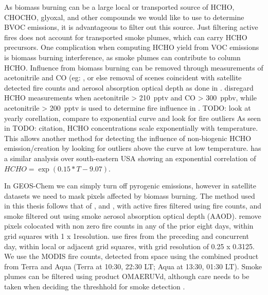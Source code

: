     As biomass burning can be a large local or transported source of HCHO, CHOCHO, glyoxal, and other compounds we would like to use to determine BVOC emissions, it is advantageous to filter out this source.
    Just filtering active fires does not account for transported smoke plumes, which can carry HCHO precursors.
    One complication when computing HCHO yield from VOC emissions is biomass burning interference, as smoke plumes can contribute to column HCHO.
    Influence from biomass burning can be removed through measurements of acetonitrile and CO (eg: \citep{Wolfe2016, Miller2017}, or else removal of scenes coincident with satellite detected fire counts and aerosol absorption optical depth as done in \cite{Marais2014}.
    \citet{Wolfe2016} disregard HCHO measurements when acetonitrile > 210~pptv and CO > 300~ppbv, while acetonitrile > 200~pptv is used to determine fire influence in \cite{Miller2017}.
    TODO: look at yearly corellation, compare to exponential curve and look for fire outliers
    As seen in TODO: citation, HCHO concentrations scale exponentially with temperature.
    This allows another method for detecting the influence of non-biogenic HCHO emission/creation by looking for outliers above the curve at low temperature.
    \cite{Zhu2013_poster} has a similar analysis over south-eastern USA showing an exponential correlation of ${HCHO} = \exp(0.15*{T}-9.07)$.
    
    In GEOS-Chem we can simply turn off pyrogenic emissions, however in satellite datasets we need to mask pixels affected by biomass burning.
    The method used in this thesis follows that of \cite{Marais2012}, and \cite{Barkley2013}, with active fires filtered using fire counts, and smoke filtered out using smoke aerosol absorption optical depth (AAOD).
    \cite{Marais2012} remove pixels colocated with non zero fire counts in any of the prior eight days, within grid squares with 1 x 1\degr resolution.
    \cite{Barkley2013} use fires from the preceding and concurrent day, within local or adjacent grid squares, with grid resolution of 0.25 x 0.3125\degr.
    We use the MODIS fire counts, detected from space using the combined product from Terra and Aqua (Terra at 10:30, 22:30 LT; Aqua at 13:30, 01:30 LT).
    Smoke plumes can be filtered using product OMAERUVd, although care needs to be taken when deciding the threshhold for smoke detection \citep{Marais2012}.
    
